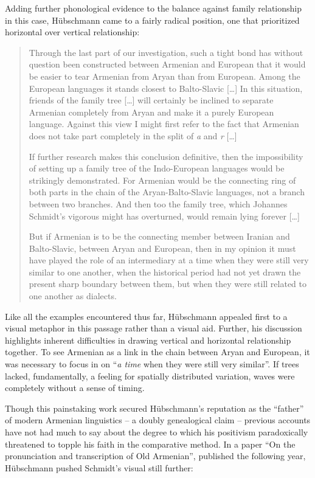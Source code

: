 \documentclass[output=paper]{langscibook}
\begin{document}
Adding further phonological evidence to the balance against family relationship in this case, Hübschmann came to a fairly radical position, one that prioritized horizontal over vertical relationship:

\begin{quotation}
Through the last part of our investigation, such a tight bond has without question been constructed between Armenian and European that it would be easier to tear Armenian from Aryan than from European. Among the European languages it stands closest to Balto-Slavic […] In this situation, friends of the family tree […] will certainly be inclined to separate Armenian completely from Aryan and make it a purely European language. Against this view I might first refer to the fact that Armenian does not take part completely in the split of \emph{a} and \emph{r} […] 

If further research makes this conclusion definitive, then the impossibility of setting up a family tree of the Indo-European languages would be strikingly demonstrated. For Armenian would be the connecting ring of both parts in the chain of the Aryan-Balto-Slavic languages, not a branch between two branches. And then too the family tree, which Johannes Schmidt's vigorous might has overturned, would remain lying forever […] 

But if Armenian is to be the connecting member between Iranian and Balto-Slavic, between Aryan and European, then in my opinion it must have played the role of an intermediary at a time when they were still very similar to one another, when the historical period had not yet drawn the present sharp boundary between them, but when they were still related to one another as dialects. \citep[183]{Huebschmann1875}
\end{quotation}

Like all the examples encountered thus far, Hübschmann appealed first to a visual metaphor in this passage rather than a visual aid. Further, his discussion highlights inherent difficulties in drawing vertical and horizontal relationship together. To see Armenian as a link in the chain between Aryan and European, it was necessary to focus in on ``\emph{a time} when they were still very similar''. If trees lacked, fundamentally, a feeling for spatially distributed variation, waves were completely without a sense of timing.

Though this painstaking work secured Hübschmann's reputation as the ``father'' of modern Armenian linguistics -- a doubly genealogical claim -- previous accounts have not had much to say about the degree to which his positivism paradoxically threatened to topple his faith in the comparative method. In a paper ``On the pronunciation and transcription of Old Armenian'', published the following year, Hübschmann pushed Schmidt's visual still further:
\end{document}
